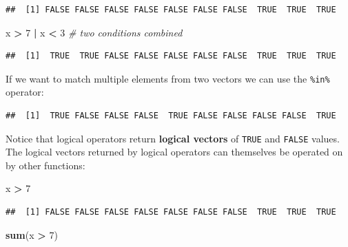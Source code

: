 \documentclass[]{book}
\newenvironment{Shaded}{\begin{snugshade}}{\end{snugshade}}
\newcommand{\KeywordTok}[1]{\textcolor[rgb]{0.13,0.29,0.53}{\textbf{#1}}}
\newcommand{\DecValTok}[1]{\textcolor[rgb]{0.00,0.00,0.81}{#1}}
\newcommand{\StringTok}[1]{\textcolor[rgb]{0.31,0.60,0.02}{#1}}
\newcommand{\CommentTok}[1]{\textcolor[rgb]{0.56,0.35,0.01}{\textit{#1}}}
\newcommand{\OperatorTok}[1]{\textcolor[rgb]{0.81,0.36,0.00}{\textbf{#1}}}
\newcommand{\NormalTok}[1]{#1}
\begin{document}
\begin{verbatim}
##  [1] FALSE FALSE FALSE FALSE FALSE FALSE FALSE  TRUE  TRUE  TRUE
\end{verbatim}

\begin{Shaded}
\begin{Highlighting}[]
\NormalTok{x }\OperatorTok{>}\StringTok{ }\DecValTok{7} \OperatorTok{|}\StringTok{ }\NormalTok{x }\OperatorTok{<}\StringTok{ }\DecValTok{3} \CommentTok{# two conditions combined}
\end{Highlighting}
\end{Shaded}

\begin{verbatim}
##  [1]  TRUE  TRUE FALSE FALSE FALSE FALSE FALSE  TRUE  TRUE  TRUE
\end{verbatim}

If we want to match multiple elements from two vectors we can use the
\texttt{\%in\%} operator:

\begin{Shaded}
\end{Shaded}

\begin{verbatim}
##  [1]  TRUE FALSE FALSE FALSE  TRUE FALSE FALSE FALSE FALSE  TRUE
\end{verbatim}

Notice that logical operators return \textbf{logical vectors} of
\texttt{TRUE} and \texttt{FALSE} values. The logical vectors returned by
logical operators can themselves be operated on by other functions:

\begin{Shaded}
\begin{Highlighting}[]
\NormalTok{x }\OperatorTok{>}\StringTok{ }\DecValTok{7}
\end{Highlighting}
\end{Shaded}

\begin{verbatim}
##  [1] FALSE FALSE FALSE FALSE FALSE FALSE FALSE  TRUE  TRUE  TRUE
\end{verbatim}

\begin{Shaded}
\begin{Highlighting}[]
\KeywordTok{sum}\NormalTok{(x }\OperatorTok{>}\StringTok{ }\DecValTok{7}\NormalTok{)}
\end{Highlighting}
\end{Shaded}
\end{document}
